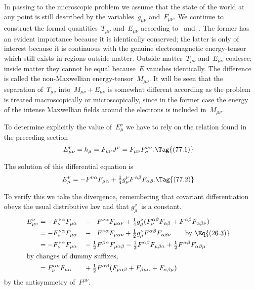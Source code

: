 \documentclass[12pt]{book}
\begin{document}
In passing to the microscopic problem we assume that the state of the world at any point is still described by
the variables~$g_{\mu\nu}$ and~$F_{\mu\nu}$.
We continue to construct the formal quantities~$T_{\mu\nu}$ and~$E_{\mu\nu}$ according to~ and~.
The former has an evident importance because it is identically conserved;
the latter is only of interest because it is continuous with the genuine electromagnetic energy\hyp{}tensor which still
exists in regions outside matter.
Outside matter~$T_{\mu\nu}$ and~$E_{\mu\nu}$ coalesce; inside matter they cannot be equal because~$E$ vanishes
identically.
The difference is called the non\hyp{}Maxwellian energy\hyp{}tensor~$M_{\mu\nu}$.
It will be seen that the separation of~$T_{\mu\nu}$ into~$M_{\mu\nu}+E_{\mu\nu}$ is somewhat different according
as the problem is treated macroscopically or microscopically, since in the former case the energy of the intense
Maxwellian fields around the electrons is included in~$M_{\mu\nu}$.

%
%

To determine explicitly the value of~$E_{\mu}^{\nu}$ we have to rely on the relation
found in the preceding section
\[
E_{\mu\nu}^{\nu} = h_{\mu} = F_{\mu\nu} J^{\nu} = F_{\mu\nu} F_{\sigma}^{\nu\sigma}.
\Tag{(77.1)}
\]

The solution of this differential equation is
\[
E_{\mu}^{\nu}  = -F^{\nu\alpha} F_{\mu\alpha} + \tfrac{1}{4} g_{\mu}^{\nu} F^{\alpha\beta} F_{\alpha\beta}.
\Tag{(77.2)}
\]

To verify this we take the divergence, remembering that covariant differentiation
obeys the usual distributive law and that $g_{\mu}^{\nu}$~is a constant.
\begin{alignat*}{2}
  E_{\mu\nu}^{\nu}
  &= -F_{\nu}^{\nu\alpha} F_{\mu\alpha}
  &&- \phantom{\tfrac{1}{2}} F^{\nu\alpha} F_{\mu\alpha\nu}
  + \tfrac{1}{4} g_{\mu}^{\nu}
     (F_{\nu}^{\alpha\beta} F_{\alpha\beta} +  F^{\alpha\beta} F_{\alpha\beta\nu}) \\
%
  &= -F_{\nu}^{\nu\alpha} F_{\mu\alpha}
  &&- \phantom{\tfrac{1}{2}} F^{\nu\alpha} F_{\mu\alpha\nu}
  + \tfrac{1}{2} g_{\mu}^{\nu} F^{\alpha\beta} F_{\alpha\beta\nu}
  \qquad\text{by~\Eq{(26.3)}} \\
%
  &= -F_{\nu}^{\nu\alpha} F_{\mu\alpha}
  &&- \tfrac{1}{2} F^{\beta\alpha} F_{\mu\alpha\beta}
    - \tfrac{1}{2} F^{\alpha\beta} F_{\mu\beta\alpha}
    + \tfrac{1}{2} F^{\alpha\beta} F_{\alpha\beta\mu} \\
\intertext{by changes of dummy suffixes,}
  &= F_{\nu}^{\alpha\nu} F_{\mu\alpha}
  &&+ \tfrac{1}{2} F^{\alpha\beta}(F_{\mu\alpha\beta} + F_{\beta\mu\alpha} + F_{\alpha\beta\mu})
\end{alignat*}
by the antisymmetry of~$F^{\mu\nu}$.
\end{document}
